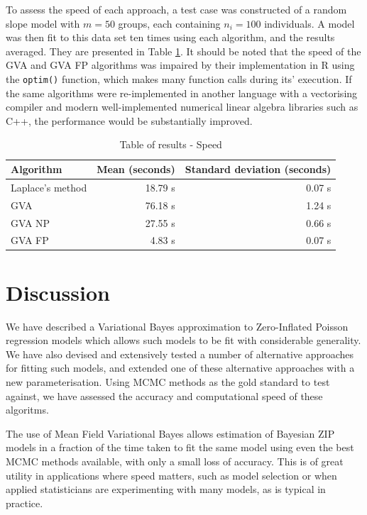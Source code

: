 \documentclass{article}[12pt]
\begin{document}
	
	\noindent To assess the speed of each approach, a test case was constructed of a random slope model with $m=50$ groups,	each containing $n_i = 100$ individuals. A model was then fit to this data set ten times using each algorithm, and the results averaged. They are presented in Table \ref{tab:application_slope_speed}. It should be noted that the speed of the GVA and GVA FP algorithms was impaired by their implementation in R using the
	\texttt{optim()} function, which makes many function calls during its' execution. If the same algorithms were
	re-implemented in another language with a vectorising compiler and modern well-implemented numerical linear
	algebra libraries such as C++, the performance would be substantially improved.
	
	\begin{table}
		\caption{Table of results - Speed}
		\label{tab:application_slope_speed}
		\begin{tabular}{|l|rr|}
			\hline
			Algorithm        & Mean (seconds) & Standard deviation (seconds) \\
			\hline
			Laplace's method & 18.79 s        & 0.07 s                       \\
			GVA              & 76.18 s        & 1.24 s                       \\
			GVA NP           & 27.55 s        & 0.66 s                       \\
			GVA FP           & 4.83 s         & 0.07 s                       \\
			\hline
		\end{tabular}
	\end{table}
	
	\section{Discussion}
	\label{sec:discussion}
	
	We have described a Variational Bayes approximation to Zero-Inflated Poisson regression models which allows
	such models to be fit with considerable generality. We have also devised and extensively tested a number of
	alternative approaches for fitting such models, and extended one of these alternative approaches with a new
	parameterisation. Using MCMC methods as the gold standard to test against, we have assessed the accuracy and
	computational speed of these algoritms.
	
	\noindent The use of Mean Field Variational Bayes allows estimation of Bayesian ZIP models in a fraction of the time taken to fit the same model using even the best MCMC methods available, with only a small loss of accuracy.
	This is of great utility in applications where speed matters, such as model selection or when applied
	statisticians are experimenting with many models, as is typical in practice.
	
\end{document}
